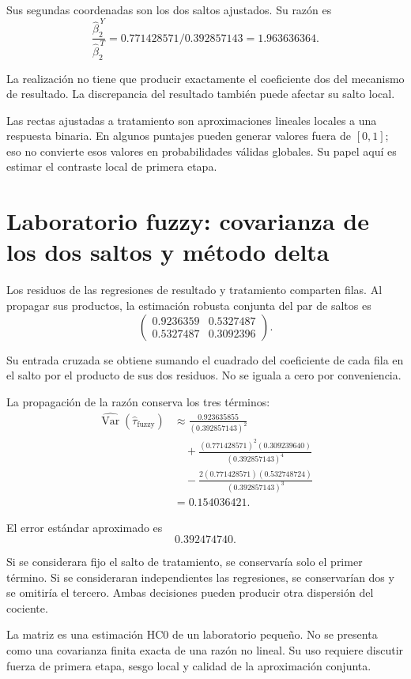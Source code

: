 \documentclass[11pt,a4paper]{article}
\DeclareMathOperator{\Var}{Var}
\begin{document}
Sus segundas coordenadas son los
dos saltos ajustados. Su razón es
\[
\frac{\widehat\beta^{\,Y}_2}{\widehat\beta^{\,T}_2}
=0.771428571/0.392857143=1.963636364.
\]

La realización no tiene que producir
exactamente el coeficiente dos del
mecanismo de resultado.
La discrepancia del resultado también
puede afectar su salto local.

Las rectas ajustadas a tratamiento
son aproximaciones lineales locales
a una respuesta binaria.
En algunos puntajes pueden generar
valores fuera de \([0,1]\);
eso no convierte esos valores
en probabilidades válidas globales.
Su papel aquí es estimar
el contraste local de primera etapa.

\clearpage
\section{Laboratorio fuzzy: covarianza de los dos saltos y método delta}\label{unidad61}
Los residuos de las regresiones de resultado
y tratamiento comparten filas.
Al propagar sus productos, la estimación
robusta conjunta del par de saltos es
\[
\begin{pmatrix}0.9236359&0.5327487\\0.5327487&0.3092396\end{pmatrix}.
\]

Su entrada cruzada se obtiene sumando
el cuadrado del coeficiente de cada
fila en el salto por el producto
de sus dos residuos.
No se iguala a cero por conveniencia.

La propagación de la razón conserva
los tres términos:
\[
\begin{aligned}
\widehat{\Var}(\widehat\tau_{\mathrm{fuzzy}})
&\approx\frac{0.923635855}{(0.392857143)^2}\\
&\quad+\frac{(0.771428571)^2(0.309239640)}{(0.392857143)^4}\\
&\quad-\frac{2(0.771428571)(0.532748724)}{(0.392857143)^3}\\
&=0.154036421.\end{aligned}
\]

El error estándar aproximado es
\[
0.392474740.
\]

Si se considerara fijo el salto de tratamiento,
se conservaría solo el primer término.
Si se consideraran independientes las regresiones,
se conservarían dos y se omitiría el tercero.
Ambas decisiones pueden producir
otra dispersión del cociente.

La matriz es una estimación HC0
de un laboratorio pequeño.
No se presenta como una covarianza
finita exacta de una razón no lineal.
Su uso requiere discutir fuerza
de primera etapa, sesgo local
y calidad de la aproximación conjunta.
\end{document}
